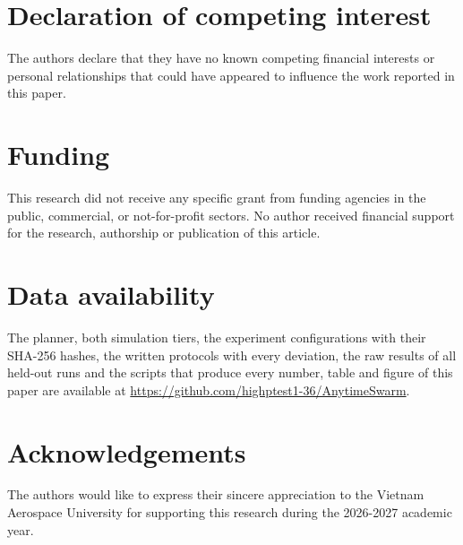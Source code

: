 \documentclass[a4paper,fleqn]{cas-dc}
\begin{document}
\section*{Declaration of competing interest}
The authors declare that they have no known competing financial interests or personal relationships that could have
appeared to influence the work reported in this paper.

\section*{Funding}
This research did not receive any specific grant from funding agencies in the public, commercial, or not-for-profit
sectors. No author received financial support for the research, authorship or publication of this article.

\section*{Data availability}
The planner, both simulation tiers, the experiment configurations with their SHA-256 hashes, the written protocols with
every deviation, the raw results of all held-out runs and the scripts that produce every number, table and figure of
this paper are available at \url{https://github.com/highptest1-36/AnytimeSwarm}.


\section*{Acknowledgements}
The authors would like to express their sincere appreciation to the Vietnam Aerospace University for supporting this
research during the 2026-2027 academic year.
\end{document}
